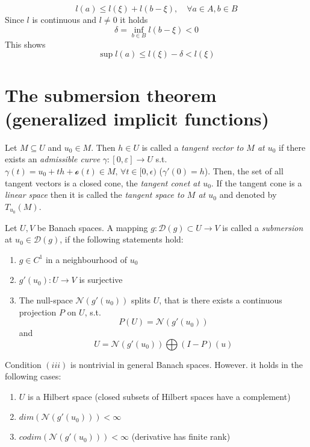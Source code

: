 





\[
	l(a) \leq l(\xi) + l(b-\xi),\quad\forall a\in A, b\in B
\]
Since $l$ is continuous and $l\not=0$ it holds
\[
	\delta = \inf_{b\in B} l(b-\xi) < 0
\]
This shows
\[
	\sup l(a) \leq l(\xi) - \delta < l(\xi)
\]

\section*{The submersion theorem (generalized implicit functions)}
\begin{definition}\label{definition_1.27}
	Let $M\subseteq U$ and $u_0\in M$. Then $h\in U$ is called a \emph{tangent vector to $M$ at $u_0$} if there exists an \emph{admissible curve} $\gamma:[0,\varepsilon]\to U$ s.t. $\gamma(t) = u_0 + th + \mathcal{o}(t)\in M,\,\forall t\in[0,\epsilon)$ ($\gamma'(0) = h$). Then, the set of all tangent vectors is a closed cone, the \emph{tangent conet at $u_0$}. If the tangent cone is a \emph{linear space} then it is called the \emph{tangent space to $M$ at $u_0$} and denoted by $T_{u_0}(M)$. 
\end{definition}
\begin{definition}[Submersion]\label{definition_1.28}
	Let $U,V$ be Banach spaces. A mapping $g:\mathcal{D}(g)\subset U\to V$ is called a \emph{submersion} at $u_0\in\mathcal{D}(g)$, if the following statements hold:
	\begin{enumerate}
		\item $g\in C^1$ in a neighbourhood of $u_0$
		\item $g'(u_0):U\to V$ is surjective
		\item The null-space $\mathcal{N}(g'(u_0))$ splits $U$, that is there exists a continuous projection $P$ on $U$, s.t.
				\[
					P(U) = \mathcal{N}(g'(u_0))
				\]
				and
				\[
					U = \mathcal{N}(g'(u_0)) \bigoplus (I-P)(u)
				\]
	\end{enumerate}
\end{definition}

\begin{remark}
	Condition $(iii)$ is nontrivial in general Banach spaces. However. it holds in the following cases:
	\begin{enumerate}
		\item $U$ is a Hilbert space (closed subsets of Hilbert spaces have a complement)
		\item $dim(\mathcal{N}(g'(u_0))) < \infty$
		\item $codim(\mathcal{N}(g'(u_0))) < \infty$ (derivative has finite rank)
	\end{enumerate}

\end{remark}

